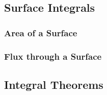 
\subsection{Surface Integrals}
\subsubsection{Area of a Surface}
\subsubsection{Flux through a Surface}

\subsection{Integral Theorems}

